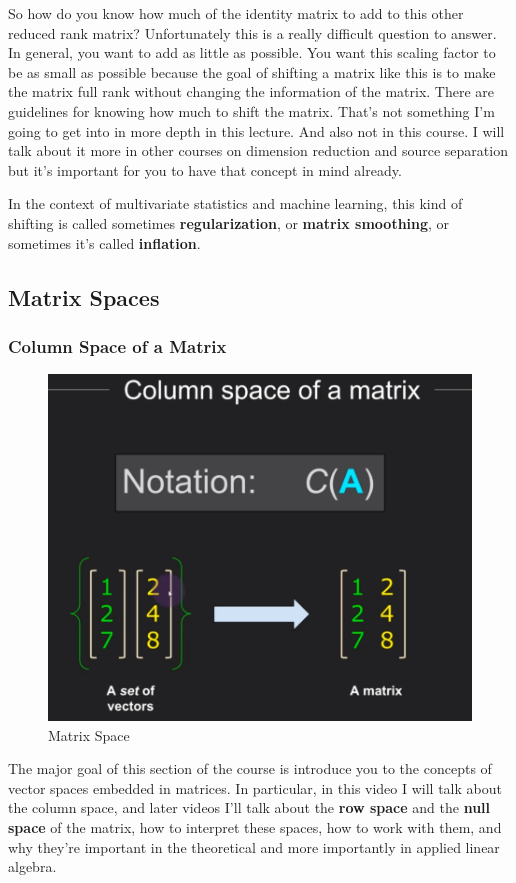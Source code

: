 \documentclass[fleqn,10pt]{olplainarticle}
\theoremstyle{definition}
\theoremstyle{remark}
\begin{document}
So how do you know how much of the identity matrix to add to this other reduced rank matrix? Unfortunately this is a really difficult question to answer. In general, you want to add as little as possible. You want this scaling factor to be as small as possible because the goal of shifting a matrix like this is to make the matrix full rank without changing the information of the matrix. There are guidelines for knowing how much to shift the matrix. That's not something I'm going to get into in more depth in this lecture. And also not in this course. I will talk about it more in other courses on dimension reduction and source separation but it's important for you to have that concept in mind already.

In the context of multivariate statistics and machine learning, this kind of shifting is called sometimes \textbf{regularization}, or \textbf{matrix smoothing}, or sometimes it's called \textbf{inflation}.

\pagebreak

\subsection*{Matrix Spaces}

\subsubsection*{Column Space of a Matrix}

\begin{figure}[ht]
	\centering
	\includegraphics[width=0.5\linewidth]{images/matrix-space-01.png}
	\caption{Matrix Space}
	\label{fig:matrix_space_01}
\end{figure}

The major goal of this section of the course is introduce you to the concepts of vector spaces embedded in matrices. In particular, in this video I will talk about the column space, and later videos I'll talk about the \textbf{row space} and the \textbf{null space} of the matrix, how to interpret these spaces, how to work with them, and why they're important in the theoretical and more importantly in applied linear algebra.
\end{document}
